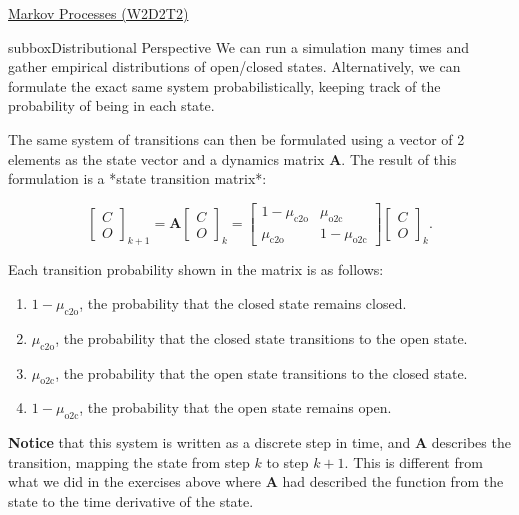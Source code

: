 \begin{textbox}{\href{https://colab.research.google.com/github/NeuromatchAcademy/course-content/blob/master/tutorials/W2D2_LinearSystems/student/W2D2_Tutorial2.ipynb}{Markov Processes (W2D2T2)} }
\begin{subbox}{subbox}{Distributional Perspective}
\scriptsize
We can run a simulation many times and gather empirical distributions of open/closed states. Alternatively, we can formulate the exact same system probabilistically, keeping track of the probability of being in each state.

The same system of transitions can then be formulated using a vector of 2 elements as the state vector and a dynamics matrix $\mathbf{A}$. The result of this formulation is a *state transition matrix*:

\[\left[ \begin{array}{c} C \\ O \end{array} \right]_{k+1} = \mathbf{A} \left[ \begin{array}{c} C \\ O \end{array} \right]_k = \left[ \begin{matrix} 1-\mu_{\text{c2o}} & \mu_{\text{o2c}} \\ \mu_{\text{c2o}} & 1-\mu_{\text{o2c}} \end{matrix} \right] \left[ \begin{array}{c} C \\ O \end{array} \right]_k.\]


Each transition probability shown in the matrix is as follows:
\begin{enumerate}
    \item 
 $1-\mu_{\text{c2o}}$, the probability that the closed state remains closed. 
\item $\mu_{\text{c2o}}$, the probability that the closed state transitions to the open state.
\item  $\mu_{\text{o2c}}$, the probability that the open state transitions to the closed state. 
\item $1-\mu_{\text{o2c}}$, the probability that the open state remains open. 
\end{enumerate}



\textbf{Notice} that this system is written as a discrete step in time, and $\mathbf{A}$ describes the transition, mapping the state from step $k$ to step $k+1$. This is different from what we did in the exercises above where $\mathbf{A}$ had described the function from the state to the time derivative of the state.


\end{subbox}
\end{textbox}
